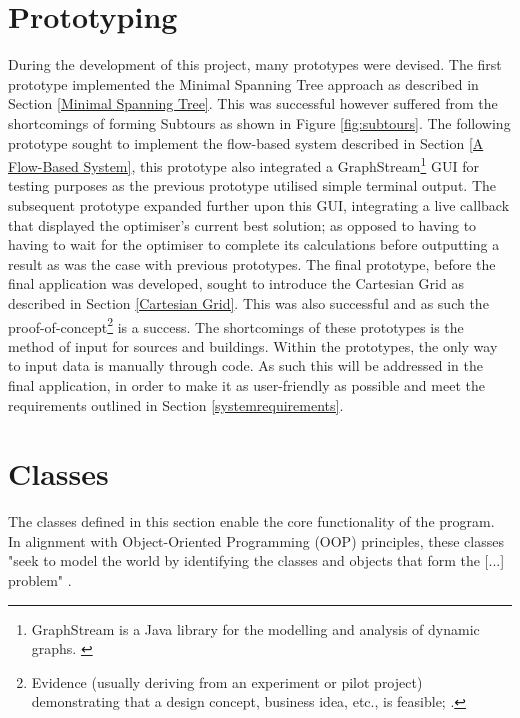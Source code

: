 \section{Prototyping}
During the development of this project, many prototypes were devised. The first prototype implemented the Minimal Spanning Tree approach as described in Section \ref{Minimal Spanning Tree}. This was successful however suffered from the shortcomings of forming Subtours as shown in Figure \ref{fig:subtours}. The following prototype sought to implement the flow-based system described in Section \ref{A Flow-Based System}, this prototype also integrated a GraphStream\footnote{GraphStream is a Java library for the modelling and analysis of dynamic graphs. \citep{graphstream}} GUI for testing purposes as the previous prototype utilised simple terminal output. The subsequent prototype expanded further upon this GUI, integrating a live callback that displayed the optimiser's current best solution; as opposed to having to having to wait for the optimiser to complete its calculations before outputting a result as was the case with previous prototypes.\newline
The final prototype, before the final application was developed, sought to introduce the Cartesian Grid as described in Section \ref{Cartesian Grid}. This was also successful and as such the proof-of-concept\footnote{Evidence (usually deriving from an experiment or pilot project) demonstrating that a design concept, business idea, etc., is feasible; \citep{oxforduniversitypress_2023_proof}.} is a success. The shortcomings of these prototypes is the method of input for sources and buildings. Within the prototypes, the only way to input data is manually through code. As such this will be addressed in the final application, in order to make it as user-friendly as possible and meet the requirements outlined in Section \ref{systemrequirements}.

\section{Classes}\label{classes}
The classes defined in this section enable the core functionality of the program. In alignment with Object-Oriented Programming (OOP) principles, these classes "seek to model the world by identifying the classes and objects that form the [...] problem" \citep{oop_analysis_with_applications}.


